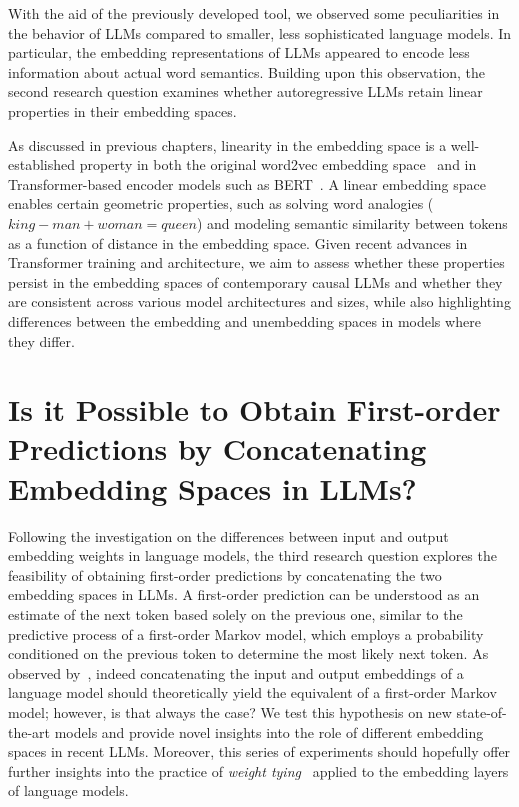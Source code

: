 With the aid of the previously developed tool, we observed some peculiarities in the behavior of LLMs compared to smaller, less sophisticated language models.
In particular, the embedding representations of LLMs appeared to encode less information about actual word semantics.
Building upon this observation, the second research question examines whether autoregressive LLMs retain linear properties in their embedding spaces.

As discussed in previous chapters, linearity in the embedding space is a well-established property in both the original word2vec embedding space~\cite{mikolov2013} and in Transformer-based encoder models such as BERT~\cite{devlin2019}.
A linear embedding space enables certain geometric properties, such as solving word analogies ($king - man + woman = queen$) and modeling semantic similarity between tokens as a function of distance in the embedding space.
Given recent advances in Transformer training and architecture, we aim to assess whether these properties persist in the embedding spaces of contemporary causal LLMs and whether they are consistent across various model architectures and sizes, while also highlighting differences between the embedding and unembedding spaces in models where they differ.

\section[Is it Possible to Obtain First-order Predictions by Concatenating Embedding Spaces in LLMs?]{Is it Possible to Obtain First-order \texorpdfstring{ \\ }{} \mbox{Predictions} by \mbox{Concatenating} \texorpdfstring{ \\ }{} Embedding Spaces in LLMs?}\label{sec:rq_fom}

Following the investigation on the differences between input and output embedding weights in language models, the third research question explores the feasibility of obtaining first-order predictions by concatenating the two embedding spaces in LLMs.
A first-order prediction can be understood as an estimate of the next token based solely on the previous one, similar to the predictive process of a first-order Markov model, which employs a probability conditioned on the previous token to determine the most likely next token.
As observed by~\citet{elhage2021}, indeed concatenating the input and output embeddings of a language model should theoretically yield the equivalent of a first-order Markov model; however, is that always the case?
We test this hypothesis on new state-of-the-art models and provide novel insights into the role of different embedding spaces in recent LLMs.
Moreover, this series of experiments should hopefully offer further insights into the practice of \emph{weight tying}~\cite{inan2017,press2017} applied to the embedding layers of language models.
